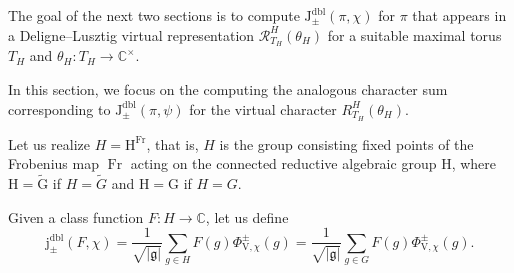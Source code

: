 \documentclass[12pt, reqno]{amsart}
\theoremstyle{definition}
\theoremstyle{definition}
\theoremstyle{definition}
\newcommand{\cComplex}{\mathbb{C}}
\newcommand{\multiplicativegroup}[1]{#1^{\times}}
\newcommand{\sizeof}[1]{\left|#1\right|}
\newcommand{\hermitianSpace}{\mathrm{V}}
\newcommand{\fieldCharacter}{\psi}
\newcommand{\Frobenius}{\operatorname{Fr}}
\newcommand{\genHermitianJacobiKernel}[2]{\Phi^{\pm}_{#1,#2}}
\newcommand{\dblJacobiSumScalar}[2]{\mathrm{J}_{\pm}^{\mathrm{dbl}}\left(#1, #2\right)}
\newcommand{\dblVirtualJacobiSumScalar}[2]{\mathrm{j}_{\pm}^{\mathrm{dbl}}\left(#1, #2\right)}
\newcommand{\lieAlgebra}{\mathfrak{g}}
\newcommand{\algebraicGroup}[1]{\boldsymbol{\mathrm{#1}}}
\newcommand{\RTGTheta}[3]{R_{#1}^{#2}(#3)}
\newcommand{\RTThetaVirtual}[3]{\mathcal{R}_{#1}^{#2}(#3)}
\begin{document}
The goal of the next two sections is to compute $\dblJacobiSumScalar{\pi}{\chi}$ for $\pi$ that appears in a Deligne--Lusztig virtual representation $\RTThetaVirtual{T_H}{H}{\theta_H}$ for a suitable maximal torus $T_H$ and $\theta_H \colon T_H \to \multiplicativegroup{\cComplex}$.

In this section, we focus on the computing the analogous character sum corresponding to $\dblJacobiSumScalar{\pi}{\fieldCharacter}$ for the virtual character $\RTGTheta{T_H}{H}{\theta_H}$.

Let us realize $H = \algebraicGroup{H}^{\Frobenius}$, that is, $H$ is the group consisting fixed points of the Frobenius map $\Frobenius$ acting on the connected reductive algebraic group $\algebraicGroup{H}$, where $\algebraicGroup{H} = \tilde{\algebraicGroup{G}}$ if $H = \tilde{G}$ and $\algebraicGroup{H} = \algebraicGroup{G}$ if $H = G$.

Given a class function $F \colon H \to \cComplex$, let us define $$\dblVirtualJacobiSumScalar{F}{\chi} = \frac{1}{\sqrt{\sizeof{\lieAlgebra}}} \sum_{g \in H} F\left(g\right) \genHermitianJacobiKernel{\hermitianSpace}{\chi}\left(g\right) =  \frac{1}{\sqrt{\sizeof{\lieAlgebra}}} \sum_{g \in G} F\left(g\right) \genHermitianJacobiKernel{\hermitianSpace}{\chi}\left(g\right).$$
\end{document}
